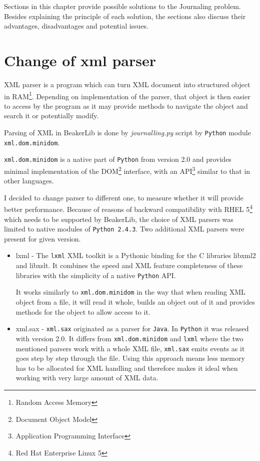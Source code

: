 Sections in this chapter provide possible solutions to the Journaling problem. Besides explaining the principle of each solution, the sections also discuss their advantages, disadvantages and potential issues.

\section{Change of xml parser}
XML parser is a program which can turn XML document into structured object in RAM\footnote{Random Access Memory}. Depending on implementation of the parser, that object is then easier to access by the program as it may provide methods to navigate the object and search it or potentially modify. 

Parsing of XML in BeakerLib is done by \textit{journalling.py} script by \texttt{Python} module \texttt{xml.dom.minidom}\cite{minidom_doc}. 

 \texttt{xml.dom.minidom} is a native part of \texttt{Python} from version 2.0 and provides minimal implementation of the DOM\footnote{Document Object Model} interface, with an API\footnote{Application Programming Interface} similar to that in other languages. 

I decided to change parser to different one, to measure whether it will provide better performance. Because of reasons of backward compatibility with RHEL 5\footnote{Red Hat Enterprise Linux 5} which needs to be supported by BeakerLib, the choice of XML parsers was limited to native modules of \texttt{Python 2.4.3}. Two additional XML parsers were present for given version.

\begin{itemize}
\item lxml - The \texttt{lxml} XML toolkit is a Pythonic binding for the C libraries libxml2 and libxslt. It combines the speed and XML feature completeness of these libraries with the simplicity of a native \texttt{Python} API\cite{lxml_doc}.

It works similarly to \texttt{xml.dom.minidom} in the way that when reading XML object from a file, it will read it whole, builds an object out of it and provides methods for the object to allow access to it.
\item xml.sax  \cite{sax_doc} - \texttt{xml.sax} originated as a parser for \texttt{Java}\cite{Sax2}. In \texttt{Python} it was released with version 2.0. It differs from \texttt{xml.dom.minidom} and \texttt{lxml} where the two mentioned parsers work with a whole XML file,  \texttt{xml.sax} emits events as it goes step by step through the file\cite{sax_example}. Using this approach means less memory has to be allocated for XML handling and therefore makes it ideal when working with very large amount of XML  data.
\end{itemize}


